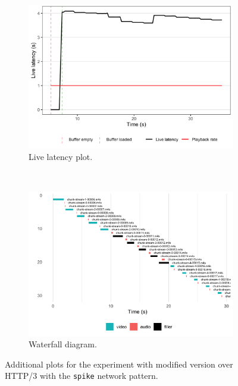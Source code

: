 \begin{figure}[h]
	\centering
	
	\begin{subfigure}[t]{0.45\textwidth}
		\centering
		\includegraphics[width=\textwidth]{res/impr_hls_filler_latency.png}
		\caption{Live latency plot.}
		\label{fig:filler2_latency}
	\end{subfigure}%
	~ 
	\begin{subfigure}[t]{0.45\textwidth}
		\centering
		\includegraphics[width=\textwidth]{res/impr_hls_filler_waterfall.png}
		\caption{Waterfall diagram.}
		\label{fig:filler2_waterfall}
	\end{subfigure}
	
	\caption{Additional plots for the experiment with modified \hlsjs{} version over HTTP/3 with the \texttt{spike} network pattern.}
	\label{fig:filler2}
\end{figure}

